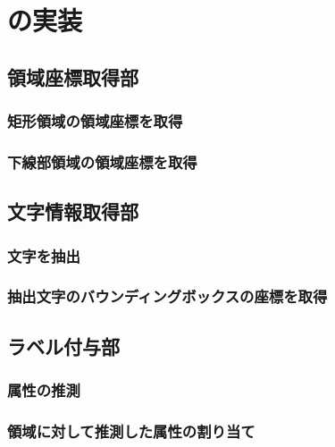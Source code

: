 \chapter{\toolName の実装}\label{cha:Implementation}



\section{領域座標取得部}\label{sec:area_detection_part}

\subsection{矩形領域の領域座標を取得}\label{subsec:rect_detection}

\subsection{下線部領域の領域座標を取得}\label{subsec:underline_detection}


\section{文字情報取得部}\label{sec:OCR_part}

\subsection{文字を抽出}\label{subsec:char_extraction}

\subsection{抽出文字のバウンディングボックスの座標を取得}\label{subsec:bbox_coords_obtainment}


\section{ラベル付与部}\label{sec:label_link_part}

\subsection{属性の推測}\label{subsec:att_prediction}

\subsection{領域に対して推測した属性の割り当て}\label{subsec:label_link}